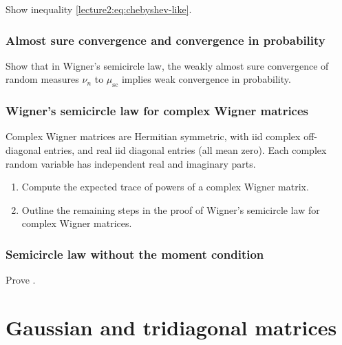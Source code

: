 \documentclass[letterpaper,11pt,oneside,reqno]{book}
\numberwithin{equation}{chapter}  %
\theoremstyle{definition}
\begin{document}
Show inequality \eqref{lecture2:eq:chebyshev-like}.

\subsection{Almost sure convergence and convergence in probability}
\label{lecture2:prob:almost-sure-convergence}

Show that in Wigner's semicircle law,
the weakly almost sure convergence
of random measures $\nu_n$ to $\mu_{\mathrm{sc}}$
implies weak convergence in probability.

\subsection{Wigner's semicircle law for complex Wigner matrices}
\label{lecture2:prob:complex-wigner}

Complex Wigner matrices are Hermitian symmetric, with iid complex off-diagonal
entries, and real iid diagonal entries (all mean zero).
Each complex random variable has independent real and imaginary parts.

\begin{enumerate}
	\item Compute the expected trace of powers of a complex Wigner matrix.
	\item Outline the remaining steps in the proof of
		Wigner's semicircle law for complex Wigner matrices.
\end{enumerate}

\subsection{Semicircle law without the moment condition}
\label{lecture2:prob:generalized-semicircle}

Prove .












\chapter{Gaussian and tridiagonal matrices}
\label{chap:lecture3}
\end{document}
